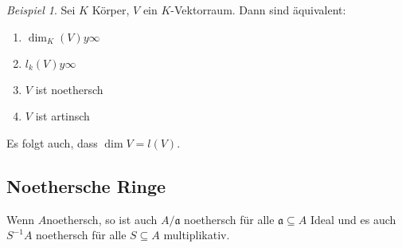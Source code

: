\documentclass[10pt,a4paper]{article}
\newcounter{thm}[section]
\theoremstyle{definition}
\theoremstyle{plain}
\theoremstyle{remark}
\newtheorem{exm}[thm]{Beispiel}
\begin{document}
\begin{exm}
	Sei $K$ Körper, $V$ ein $K$-Vektorraum. Dann sind äquivalent:
	\begin{enumerate}
		\item $\dim_K(V)y\infty$
		\item $l_k(V)y\infty$
		\item $V$ ist noethersch
		\item $V$ ist artinsch
	\end{enumerate}
	Es folgt auch, dass $\dim V=l(V)$.
\end{exm}




\subsection{Noethersche Ringe}
Wenn $A$noethersch, so ist auch $A/\mathfrak a$ noethersch für alle $\mathfrak a\subseteq A$ Ideal und es auch $S^{-1}A$ noethersch für alle $S\subseteq A$ multiplikativ.
\end{document}
